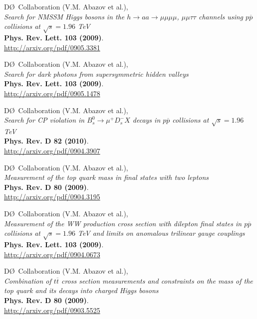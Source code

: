 \documentclass[12pt]{article}
\begin{document}
%
D\O~Collaboration (V.M. Abazov et al.), \\
\textsl{Search for NMSSM Higgs bosons in the $h\rightarrow aa \rightarrow \mu \mu \mu \mu$, $\mu \mu \tau \tau$ channels using $p\overline{p}$ collisions at $\sqrt{s}=1.96$ TeV}\\
\textbf{Phys. Rev. Lett. 103 (2009)}.\\
{\small{\url{http://arxiv.org/pdf/0905.3381}}}\vspace{4mm}

%
D\O~Collaboration (V.M. Abazov et al.), \\
\textsl{Search for dark photons from supersymmetric hidden valleys}\\
\textbf{Phys. Rev. Lett. 103 (2009)}.\\
{\small{\url{http://arxiv.org/pdf/0905.1478}}}\vspace{4mm}

%
D\O~Collaboration (V.M. Abazov et al.), \\
\textsl{ Search for CP violation in $B_s^0 \rightarrow \mu^+ D_s^- X$ decays in $p\overline{p}$ collisions at $\sqrt{s}=1.96$ TeV}\\
\textbf{Phys. Rev. D 82 (2010)}.\\
{\small{\url{http://arxiv.org/pdf/0904.3907}}}\vspace{4mm}

%
D\O~Collaboration (V.M. Abazov et al.), \\
\textsl{Measurement of the top quark mass in final states with two leptons}\\
\textbf{Phys. Rev. D 80 (2009)}.\\
{\small{\url{http://arxiv.org/pdf/0904.3195}}}\vspace{4mm}

%
D\O~Collaboration (V.M. Abazov et al.), \\
\textsl{Measurement of the WW production cross section with dilepton final states in $p\overline{p}$ collisions at $\sqrt{s}=1.96$ TeV and limits on anomalous trilinear gauge couplings}\\
\textbf{Phys. Rev. Lett. 103 (2009)}.\\
{\small{\url{http://arxiv.org/pdf/0904.0673}}}\vspace{4mm}

%
D\O~Collaboration (V.M. Abazov et al.), \\
\textsl{Combination of $t\overline{t}$ cross section measurements and constraints on the mass of the top quark and its decays into charged Higgs bosons}\\
\textbf{Phys. Rev. D 80 (2009)}.\\
{\small{\url{http://arxiv.org/pdf/0903.5525}}}\vspace{4mm}
\end{document}
